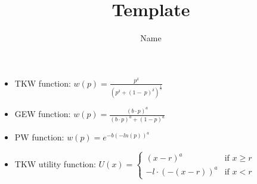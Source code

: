\documentclass[11pt]{article}
\title{Template}
\author{Name}
\begin{document}
\maketitle

\begin{itemize}
    \item TKW function: $w(p)=\frac{p^{\delta}}{(p^{\delta}+(1-\ p)^{\delta})^{\frac{1}{\delta}}}$
    \item GEW function: $w(p)=\frac{(b\cdot{p})^{a}}{(b\cdot{p})^{a} + (1-p)^{a}}$
    \item PW function: $w(p)=e^{-b(-ln(p))^{a}}$
\end{itemize}
\begin{itemize}
    \item TKW utility function: $U(x)=\begin{cases}
                  (x-r)^{a}             & \text{if }x \geq r \\
                  -l \cdot (-(x-r))^{a} & \text{if }x < r
              \end{cases}$
\end{itemize}
\end{document}
